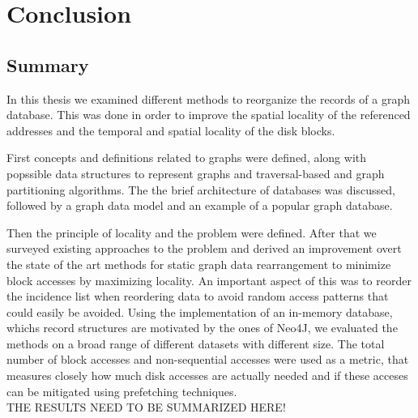 \chapter{Conclusion}\label{\positionnumber}

\section{Summary}\label{\positionnumber}
In this thesis we examined different methods to reorganize the records of a graph database.
This was done in order to improve the spatial locality of the referenced addresses and the temporal and spatial locality of the disk blocks.

First concepts and definitions related to graphs were defined, along with popssible data structures to represent graphs and traversal-based and graph partitioning algorithms.
The the brief architecture of databases was discussed, followed by a graph data model and an example of a popular graph database.

Then the principle of locality and the problem were defined.
After that we surveyed existing approaches to the problem and derived an improvement overt the state of the art methods for static graph data rearrangement to minimize block accesses by maximizing locality.
An important aspect of this was to reorder the incidence list when reordering data to avoid random access patterns that could easily be avoided.
Using the implementation of an in-memory database, whichs record structures are motivated by the ones of Neo4J, we evaluated the methods on a broad range of different datasets with different size.
The total number of block accesses and non-sequential accesses were used as a metric, that measures closely how much disk accesses are actually needed and if these acceses can be mitigated using prefetching techniques.  \\

THE RESULTS NEED TO BE SUMMARIZED HERE!





